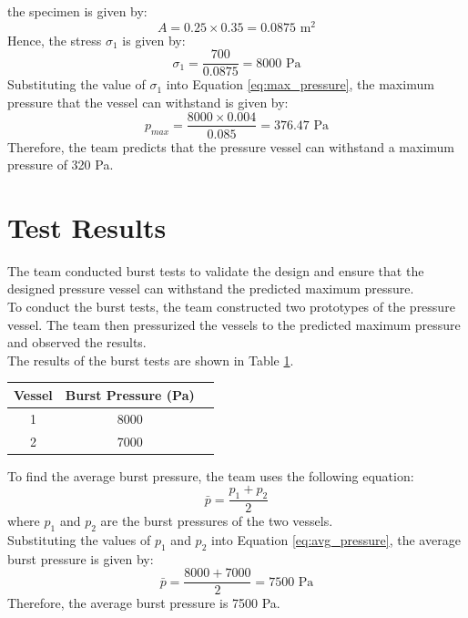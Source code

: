 \documentclass[12pt, titlepage]{article}
\begin{document}
the specimen is given by:
\begin{equation}
    A = 0.25 \times 0.35 = 0.0875 \text{ m}^2
    \label{eq:area}
\end{equation}
Hence, the stress $\sigma_1$ is given by:
\begin{equation}
    \sigma_1 = \frac{700}{0.0875} = 8000 \text{ Pa}
    \label{eq:stress_value}
\end{equation}
Substituting the value of $\sigma_1$ into Equation \ref{eq:max_pressure}, the
maximum pressure that the vessel can withstand is given by:
\begin{equation}
    p_{max} = \frac{8000 \times 0.004}{0.085} = 376.47 \text{ Pa}
    \label{eq:max_pressure_value}
\end{equation}
Therefore, the team predicts that the pressure vessel can withstand a maximum
pressure of 320 Pa.
\newpage
\section{Test Results}
The team conducted burst tests to validate the design and ensure
that the designed pressure vessel can withstand the predicted maximum
pressure.\\[10pt]
To conduct the burst tests, the team constructed two prototypes of the
pressure vessel. The team then pressurized the vessels to the predicted maximum
pressure and observed the results.\\[10pt]
The results of the burst tests are shown in Table \ref{tab:burst_tests}.
\begin{table}[htb]
    \centering
    \begin{tabular}{ccc}
        \toprule
        Vessel & Burst Pressure (Pa) \\
        \midrule
        1 & 8000 \\
        2 & 7000 \\
        \bottomrule
    \end{tabular}
    \label{tab:burst_tests}
\end{table}
To find the average burst pressure, the team uses the following equation:
\begin{equation}
    \bar{p} = \frac{p_1 + p_2}{2}
    \label{eq:avg_pressure}
\end{equation}
where $p_1$ and $p_2$ are the burst pressures of the two vessels.\\[10pt]
Substituting the values of $p_1$ and $p_2$ into Equation \ref{eq:avg_pressure},
the average burst pressure is given by:
\begin{equation}
    \bar{p} = \frac{8000 + 7000}{2} = 7500 \text{ Pa}
    \label{eq:avg_pressure_value}
\end{equation}
Therefore, the average burst pressure is 7500 Pa.
\newpage
\end{document}
